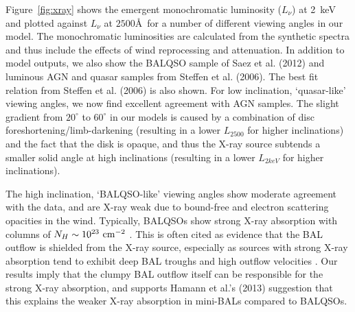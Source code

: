 \documentclass[useAMS,usenatbib]{mn2e_x}
\begin{document}
Figure~\ref{fig:xray} shows the emergent
monochromatic luminosity ($L_\nu$) at 2~keV and 
plotted against $L_\nu$ at $2500$\AA\ for a number of different viewing angles in our model.
The monochromatic luminosities are calculated from the synthetic spectra and thus include
the effects of wind reprocessing and attenuation. In addition to model outputs,
we also show the BALQSO sample of Saez et al. (2012) and luminous AGN and quasar
samples from Steffen et al. (2006). The best fit relation from Steffen et al. (2006) 
is also shown. For low inclination, `quasar-like' viewing angles,
we now find excellent agreement with AGN samples. The slight gradient from $20^\circ$ to
$60^\circ$ in our models is caused by a combination of disc foreshortening/limb-darkening 
(resulting in a lower $L_{2500}$ for higher inclinations) and the fact that the disk 
is opaque, and thus the X-ray source subtends a smaller solid angle at high inclinations
(resulting in a lower $L_{2keV}$ for higher inclinations). 


The high inclination, `BALQSO-like' viewing angles show moderate agreement with the data,
and are X-ray weak due to bound-free and electron scattering opacities in the wind.
Typically, BALQSOs show strong X-ray absorption with columns 
of $N_H\sim10^{23}~\rm{cm^{-2}}$ 
\citep{green1996,mathur2000,green2001,grupemathur2003}.
This is often cited as evidence that the BAL outflow is shielded from
the X-ray source, especially as sources with strong X-ray absorption tend
to exhibit deep BAL troughs and high outflow velocities 
\citep{brandt2000,laorbrandt2002,gallagher2006}.
Our results imply that the clumpy BAL outflow
itself can be responsible for the strong X-ray absorption, 
and supports Hamann et al.'s (2013) suggestion that 
this explains the weaker X-ray absorption in mini-BALs 
compared to BALQSOs.

\end{document}
